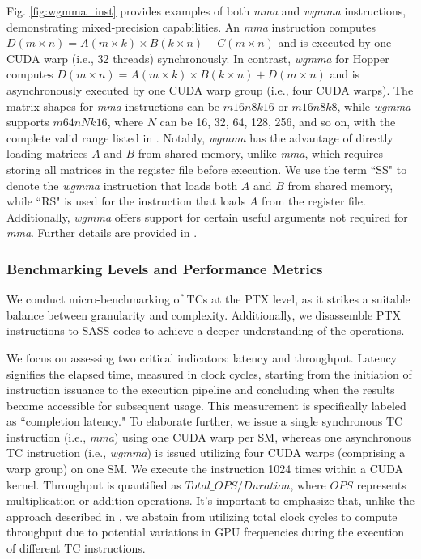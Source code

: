 Fig. \ref{fig:wgmma_inst} provides examples of both \emph{mma} and \emph{wgmma} instructions, demonstrating mixed-precision capabilities. An \emph{mma} instruction computes $D(m \times n) = A(m \times k) \times B(k \times n) + C(m \times n)$ and is executed by one CUDA warp (i.e., 32 threads) synchronously. In contrast, \emph{wgmma} for Hopper computes $D(m \times n) = A(m \times k) \times B(k \times n) + D(m \times n)$ and is asynchronously executed by one CUDA warp group (i.e., four CUDA warps). The matrix shapes for \emph{mma} instructions can be $m16n8k16$ or $m16n8k8$, while \emph{wgmma} supports $m64nNk16$, where $N$ can be 16, 32, 64, 128, 256, and so on, with the complete valid range listed in \cite{nvidia-ptx-doc}. Notably, \emph{wgmma} has the advantage of directly loading matrices $A$ and $B$ from shared memory, unlike \emph{mma}, which requires storing all matrices in the register file before execution. We use the term ``SS" to denote the \emph{wgmma} instruction that loads both $A$ and $B$ from shared memory, while ``RS" is used for the instruction that loads $A$ from the register file. Additionally, \emph{wgmma} offers support for certain useful arguments not required for \emph{mma}. Further details are provided in \cite{nvidia-ptx-doc}.

\subsubsection{Benchmarking Levels and Performance Metrics} We conduct micro-benchmarking of TCs at the PTX level, as it strikes a suitable balance between granularity and complexity. Additionally, we disassemble PTX instructions to SASS codes to achieve a deeper understanding of the operations.

We focus on assessing two critical indicators: latency and throughput. Latency signifies the elapsed time, measured in clock cycles, starting from the initiation of instruction issuance to the execution pipeline and concluding when the results become accessible for subsequent usage. This measurement is specifically labeled as ``completion latency." To elaborate further, we issue a single synchronous TC instruction (i.e., \emph{mma}) using one CUDA warp per SM, whereas one asynchronous TC instruction (i.e., \emph{wgmma}) is issued utilizing four CUDA warps (comprising a warp group) on one SM. We execute the instruction 1024 times within a CUDA kernel. Throughput is quantified as $Total\_{OPS}/Duration$, where $OPS$ represents multiplication or addition operations. It's important to emphasize that, unlike the approach described in \cite{sun_tpds_2023}, we abstain from utilizing total clock cycles to compute throughput due to potential variations in GPU frequencies during the execution of different TC instructions.


